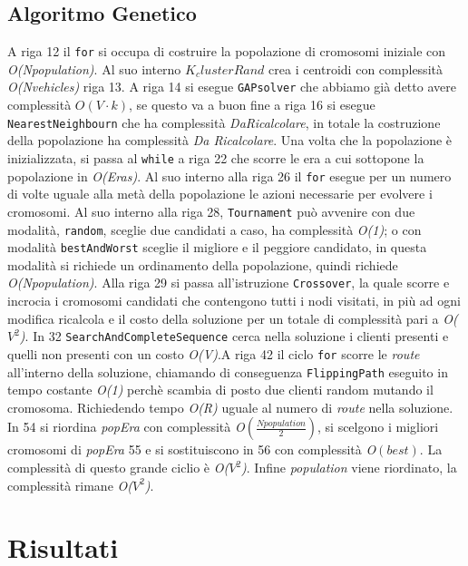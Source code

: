 \documentclass[]{article}
\begin{document}
\subsection{Algoritmo Genetico}
A riga 12 il \texttt{for} si occupa di costruire la popolazione di cromosomi iniziale con \emph{O(Npopulation)}. Al suo interno \emph{$K_clusterRand$} crea i centroidi con complessità \emph{O(Nvehicles)} riga 13. A riga 14 si esegue \texttt{GAPsolver} che abbiamo già detto avere complessità 
 \emph{$O(V \cdot k)$}, se questo va a buon fine  a riga 16  si esegue \texttt{NearestNeighbourn} che ha complessità \emph{DaRicalcolare}, in totale la costruzione della popolazione ha complessità \emph{Da Ricalcolare}. 
 Una volta che la popolazione è inizializzata, si passa al \texttt{while} a riga 22 che scorre le era a cui sottopone la popolazione in \emph{O(Eras)}. Al suo interno alla riga 26 il \texttt{for} esegue per un numero di volte uguale alla metà della popolazione le azioni necessarie per evolvere i cromosomi.
 Al suo interno alla riga 28, \texttt{Tournament} può avvenire con due modalità, \texttt{random}, sceglie due candidati a caso, ha complessità \emph{O(1)}; o con modalità \texttt{bestAndWorst} sceglie il migliore e il peggiore candidato, in questa modalità si richiede un ordinamento della popolazione, quindi richiede \emph{O(Npopulation)}. Alla riga 29 si passa all'istruzione \texttt{Crossover}, la quale scorre e incrocia i cromosomi candidati che contengono tutti i nodi visitati, in più ad ogni modifica ricalcola e il costo della soluzione per un totale di complessità pari a \emph{O($V^2$)}. In 32 \texttt{SearchAndCompleteSequence} cerca nella soluzione i clienti presenti e quelli non presenti con un costo \emph{O(V)}.A riga 42 il ciclo \texttt{for} scorre le \emph{route} all'interno della soluzione, chiamando di conseguenza \texttt{FlippingPath} eseguito in tempo costante \emph{O(1)} perchè scambia di posto due clienti random mutando il cromosoma. Richiedendo tempo \emph{O(R)} uguale al numero di \emph{route} nella soluzione.
 In 54 si riordina \textit{popEra} con complessità \emph{O$(\frac{Npopulation}{2})$}, si scelgono i migliori cromosomi di \textit{popEra} 55 e si sostituiscono  in 56 con complessità \emph{O$(best)$}. La complessità di questo grande ciclio è \emph{O($V^2$)}.
 Infine \textit{population} viene riordinato, la complessità rimane  \emph{O($V^2$)}.

\newpage
 
\section{Risultati}
 
\end{document}
